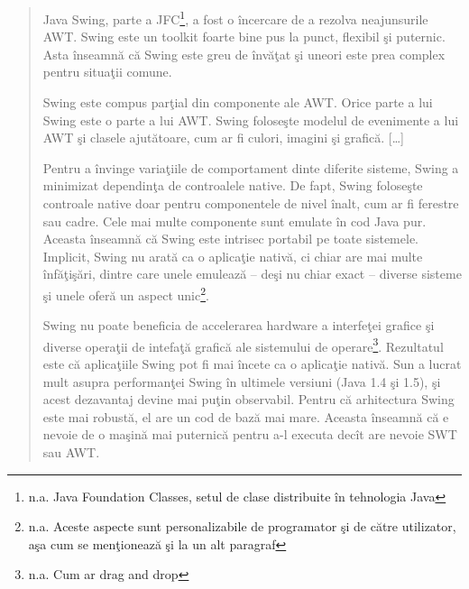 \begin{quotation}
Java Swing, parte a JFC\footnote{n.a. Java Foundation Classes, setul de clase
distribuite în tehnologia Java}, a fost o încercare de a rezolva neajunsurile
AWT. Swing este un toolkit foarte bine pus la punct, flexibil şi puternic. Asta
înseamnă că Swing este greu de învăţat şi uneori este prea complex pentru
situaţii comune.

Swing este compus parţial din componente ale AWT. Orice parte a lui Swing este o
parte a lui AWT. Swing foloseşte modelul de evenimente a lui AWT şi clasele
ajutătoare, cum ar fi culori, imagini şi grafică. [\ldots]

Pentru a învinge variaţiile de comportament dinte diferite sisteme, Swing a 
minimizat dependinţa de controalele native. De fapt, Swing foloseşte controale 
native doar pentru componentele de nivel înalt, cum ar fi ferestre sau cadre. 
Cele mai multe componente sunt emulate în cod Java pur. Aceasta înseamnă că 
Swing este intrisec portabil pe toate sistemele. Implicit, Swing nu arată ca o 
aplicaţie nativă, ci chiar are mai multe înfăţişări, dintre care unele emulează 
-- deşi nu chiar exact -- diverse sisteme şi unele oferă un aspect 
unic\footnote{n.a. Aceste aspecte sunt personalizabile de programator şi de 
către utilizator, aşa cum se menţionează şi \cite{swtawtswing} la un alt 
paragraf}.

Swing nu poate beneficia de accelerarea hardware a interfeţei grafice şi diverse
operaţii de intefaţă grafică ale sistemului de operare\footnote{n.a. Cum ar
drag and drop}. Rezultatul este că aplicaţiile Swing pot fi mai încete ca o
aplicaţie nativă. Sun a lucrat mult asupra performanţei Swing în ultimele
versiuni (Java 1.4 şi 1.5), şi acest dezavantaj devine mai puţin observabil.
Pentru că arhitectura Swing este mai robustă, el are un cod de bază mai mare.
Aceasta înseamnă că e nevoie de o maşină mai puternică pentru a-l executa decît
are nevoie SWT sau AWT.
\cite{swtawtswing}
\end{quotation}
